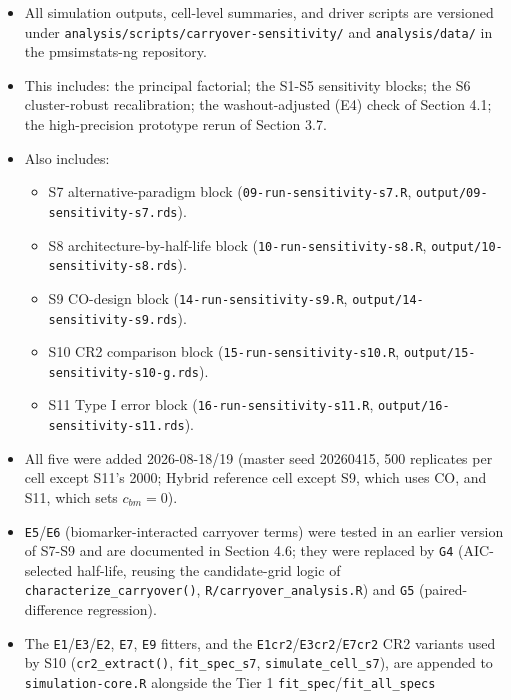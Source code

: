 \documentclass[
  11pt,
]{article}
\providecommand{\tightlist}{%
  \setlength{\itemsep}{0pt}\setlength{\parskip}{0pt}}
\begin{document}
\begin{itemize}
\tightlist
\item
  All simulation outputs, cell-level summaries, and driver scripts
  are versioned under \texttt{analysis/scripts/carryover-sensitivity/} and
  \texttt{analysis/data/} in the pmsimstats-ng repository.
\item
  This includes: the principal factorial; the S1-S5 sensitivity
  blocks; the S6 cluster-robust recalibration; the washout-adjusted
  (E4) check of Section 4.1; the high-precision prototype rerun of
  Section 3.7.
\item
  Also includes:

  \begin{itemize}
  \tightlist
  \item
    S7 alternative-paradigm block (\texttt{09-run-sensitivity-s7.R},
    \texttt{output/09-sensitivity-s7.rds}).
  \item
    S8 architecture-by-half-life block (\texttt{10-run-sensitivity-s8.R},
    \texttt{output/10-sensitivity-s8.rds}).
  \item
    S9 CO-design block (\texttt{14-run-sensitivity-s9.R},
    \texttt{output/14-sensitivity-s9.rds}).
  \item
    S10 CR2 comparison block (\texttt{15-run-sensitivity-s10.R},
    \texttt{output/15-sensitivity-s10-g.rds}).
  \item
    S11 Type I error block (\texttt{16-run-sensitivity-s11.R},
    \texttt{output/16-sensitivity-s11.rds}).
  \end{itemize}
\item
  All five were added 2026-08-18/19 (master seed 20260415, 500
  replicates per cell except S11's 2000; Hybrid reference cell except
  S9, which uses CO, and S11, which sets \(c_{bm}=0\)).
\item
  \texttt{E5}/\texttt{E6} (biomarker-interacted carryover terms) were tested in an
  earlier version of S7-S9 and are documented in Section 4.6; they
  were replaced by \texttt{G4} (AIC-selected half-life, reusing the
  candidate-grid logic of \texttt{characterize\_carryover()},
  \texttt{R/carryover\_analysis.R}) and \texttt{G5} (paired-difference regression).
\item
  The \texttt{E1}/\texttt{E3}/\texttt{E2}, \texttt{E7}, \texttt{E9} fitters, and the
  \texttt{E1cr2}/\texttt{E3cr2}/\texttt{E7cr2} CR2 variants used by S10 (\texttt{cr2\_extract()},
  \texttt{fit\_spec\_s7}, \texttt{simulate\_cell\_s7}), are appended to
  \texttt{simulation-core.R} alongside the Tier 1 \texttt{fit\_spec}/\texttt{fit\_all\_specs}

\end{itemize}
\end{document}

